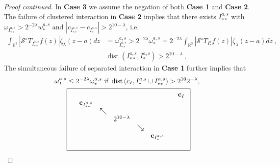 \documentclass{amsart}%
\theoremstyle{plain}
\numberwithin{equation}{section}
\begin{document}
\begin{proof}
[Proof continued]In \textbf{Case 3} we assume the negation of both
\textbf{Case 1} and \textbf{Case 2}. The failure of clustered interaction in
\textbf{Case 2} implies that there exists $I_{\ast\ast}^{a,s}$ with
$\omega_{I_{\ast\ast}^{a,s}}>2^{-2\lambda}w_{\ast}^{a,s}$ and $\left\vert
c_{I_{\ast\ast}^{a,s}}-c_{I_{\ast}^{a,s}}\right\vert >2^{10-\lambda}$, i.e.%
\begin{align*}
\int_{\mathbb{R}^{3}}\left\vert \mathcal{S}^{s}T_{I_{\ast\ast}^{a,s}}f\left(
z\right)  \right\vert \zeta_{\lambda}\left(  z-a\right)  dz  &  =\omega
_{I_{\ast\ast}^{a,s}}^{a,s}>2^{-2\lambda}\omega_{\ast}^{a,s}=2^{-2\lambda}%
\int_{\mathbb{R}^{3}}\left\vert \mathcal{S}^{s}T_{I_{\ast}^{a}}f\left(
z\right)  \right\vert \zeta_{\lambda}\left(  z-a\right)  dz\ ,\\
&  \operatorname*{dist}\left(  I_{\ast\ast}^{a,s},I_{\ast}^{a,s}\right)
>2^{10-\lambda}\ ,
\end{align*}
The simultaneous failure of separated interaction in \textbf{Case 1} further
implies that%
\begin{align}
\omega_{I}^{a,s}  &  \leq2^{-2\lambda}\omega_{\ast}^{a,s}\text{ if
}\operatorname*{dist}\left(  c_{I},I_{\ast}^{a,s}\cup I_{\ast\ast}%
^{a,s}\right)  >2^{10}2^{-\lambda},\label{simul}\\
&  \fbox{$%
\begin{array}
[c]{cccccccc}
&  &  &  &  &  &  & \mathbf{c}_{I}\\
& \mathbf{c}_{I_{\ast\ast}^{a,s}} &  &  &  &  &  & \\
&  & \nwarrow &  &  &  &  & \\
&  &  & 2^{10-\lambda} &  &  &  & \\
&  &  &  & \searrow &  &  & \\
&  &  &  &  & \mathbf{c}_{I_{\ast}^{a,s}} &  & \\
&  &  &  &  &  &  &
\end{array}
$}\nonumber
\end{align}



\end{proof}
\end{document}
